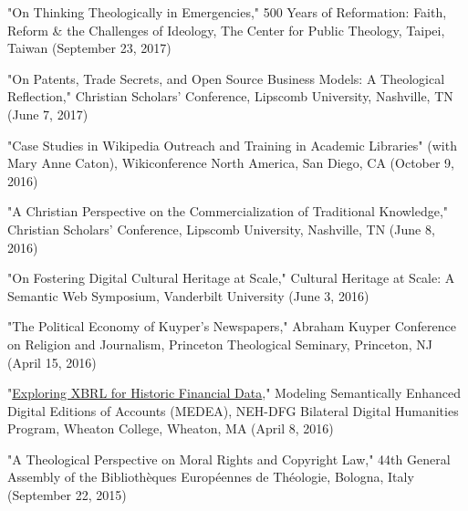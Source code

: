 \documentclass[10pt]{res} %
\begin{document}
\begin{resume}
\begin{hangparas}{.25in}{1}"On Thinking Theologically in Emergencies," 500 Years of Reformation: Faith, Reform \& the Challenges of Ideology, The Center for Public Theology, Taipei, Taiwan (September 23, 2017)\end{hangparas}

\begin{hangparas}{.25in}{1}"On Patents, Trade Secrets, and Open Source Business Models: A Theological Reflection," Christian Scholars’ Conference, Lipscomb University, Nashville, TN (June 7, 2017)\end{hangparas}

\begin{hangparas}{.25in}{1}"Case Studies in Wikipedia Outreach and Training in Academic Libraries" (with Mary Anne Caton), Wikiconference North America, San Diego, CA (October 9, 2016)\end{hangparas}

\begin{hangparas}{.25in}{1}"A Christian Perspective on the Commercialization of Traditional Knowledge," Christian Scholars’ Conference, Lipscomb University, Nashville, TN (June 8, 2016)\end{hangparas}

\begin{hangparas}{.25in}{1}"On Fostering Digital Cultural Heritage at Scale," Cultural Heritage at Scale: A Semantic Web Symposium, Vanderbilt University (June 3, 2016)\end{hangparas}

\begin{hangparas}{.25in}{1}"The Political Economy of Kuyper’s Newspapers," Abraham Kuyper Conference on Religion and Journalism, Princeton Theological Seminary, Princeton, NJ (April 15, 2016)\end{hangparas}

\begin{hangparas}{.25in}{1}"\href{http://medea.hypotheses.org/497}{Exploring XBRL for Historic Financial Data}," Modeling Semantically Enhanced Digital Editions of Accounts (MEDEA), NEH-DFG Bilateral Digital Humanities Program, Wheaton College, Wheaton, MA (April 8, 2016)\end{hangparas}

\begin{hangparas}{.25in}{1}"A Theological Perspective on Moral Rights and Copyright Law," 44th General Assembly of the Bibliothèques Européennes de Théologie, Bologna, Italy (September 22, 2015)\end{hangparas}


\end{resume}
\end{document}
